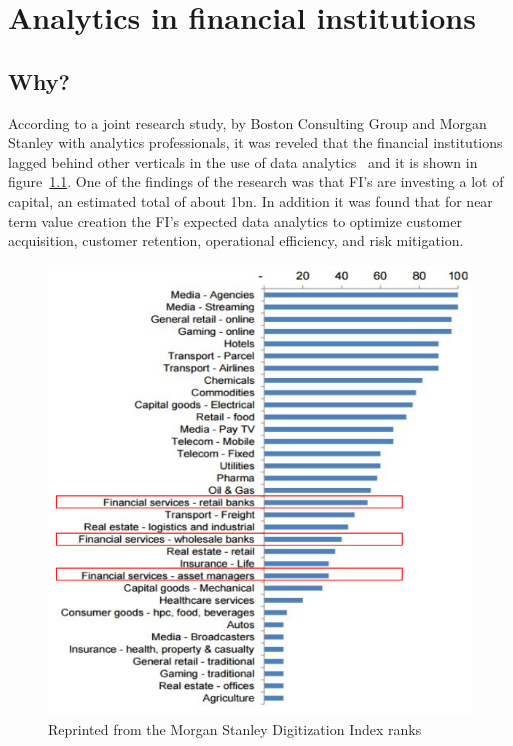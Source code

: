 \setlength{\footskip}{8mm}

\chapter{Analytics in financial institutions}

\section{Why?}
According to a joint research study, by Boston Consulting Group and Morgan Stanley with analytics professionals, it was reveled that the financial institutions lagged behind other verticals in the use of data analytics~ and it is shown in figure~\ref{fig:da_digitization}. One of the findings of the research was that FI's are investing a lot of capital, an estimated total of about \textdollar1bn. In addition it was found that for near term value creation the FI's expected data analytics to optimize customer acquisition, customer retention, operational efficiency, and risk mitigation.
\newline
\newline
\begin{figure}[H]
	\includegraphics[scale = 0.7]{figures/DA_used_verticals.png}
	\caption{Reprinted from the Morgan Stanley Digitization Index ranks }
	\label{fig:da_digitization}
\end{figure}
\FloatBarrier

